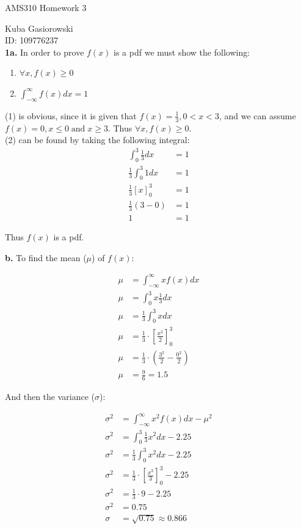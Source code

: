 \documentclass[12pt]{report}
\begin{document}
\Large
\centering
AMS310 Homework 3

\justify
\normalsize

Kuba Gasiorowski\\
ID: 109776237\\

\noindent \textbf{1a.} In order to prove $f(x)$ is a pdf we must show the following:
\begin{enumerate}
	\item $\forall x, f(x) \geq 0$
	\item $\int_{-\infty}^{\infty} f(x)dx = 1$
\end{enumerate}

\noindent (1) is obvious, since it is given that $ f(x) = \frac{1}{3}, 0 < x < 3 $, and we can assume $f(x) = 0, x \leq 0 \;\text{and}\; x \geq 3$. Thus $\forall x, f(x) \geq 0$.\\

\noindent (2) can be found by taking the following integral: 
\begin{align*}
\int_{0}^{3}\frac{1}{3}dx &= 1\\
\frac{1}{3}\int_{0}^{3}1dx &= 1\\
\frac{1}{3}\left[x\right]_0^3 &= 1\\
\frac{1}{3}(3 - 0) &= 1\\
1 &= 1
\end{align*}

\noindent Thus $f(x)$ is a pdf. \\

\pagebreak

\noindent \textbf{b.} To find the mean ($\mu$) of $f(x)$:

\begin{align*}
\mu &= \int_{-\infty}^{\infty} xf(x)dx \\
\mu &= \int_0^3 x\frac{1}{3}dx \\
\mu &= \frac{1}{3}\int_0^3 xdx \\
\mu &= \frac{1}{3} \cdot \left[\frac{x^2}{2}\right]_0^3 \\
\mu &= \frac{1}{3} \cdot \left(\frac{3^2}{2} - \frac{0^2}{2}\right)\\
\mu &= \boxed{\frac{9}{6} = 1.5}
\end{align*}

\noindent And then the variance ($\sigma$):

\begin{align*}
\sigma^2 &= \int_{-\infty}^{\infty} x^2f(x)dx - \mu^2\\
\sigma^2 &= \int_{0}^{3} \frac{1}{3}x^2dx - 2.25\\
\sigma^2 &= \frac{1}{3}\int_{0}^{3}x^2dx - 2.25\\
\sigma^2 &= \frac{1}{3} \cdot \left[ \frac{x^3}{3} \right]_0^3 - 2.25\\
\sigma^2 &= \frac{1}{3} \cdot 9 - 2.25\\
\sigma^2 &= 0.75\\
\sigma &= \boxed{\sqrt{0.75} \approx 0.866}\\ 
\end{align*}
\end{document}
